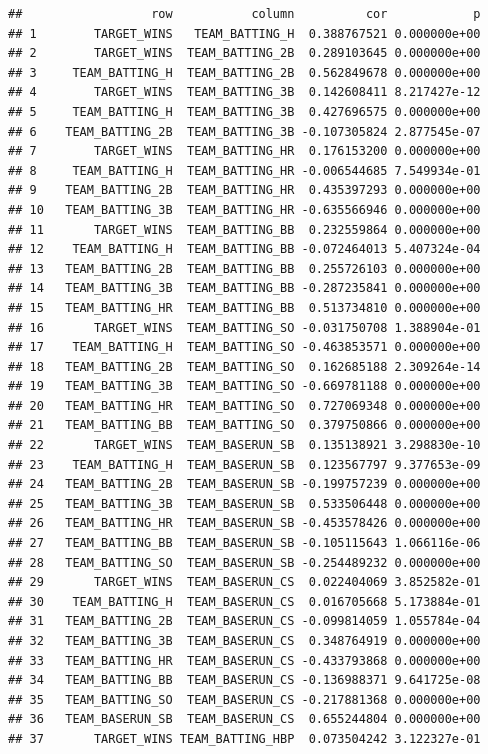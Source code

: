 \documentclass[
]{article}
\begin{document}
\begin{verbatim}
##                  row           column          cor            p
## 1        TARGET_WINS   TEAM_BATTING_H  0.388767521 0.000000e+00
## 2        TARGET_WINS  TEAM_BATTING_2B  0.289103645 0.000000e+00
## 3     TEAM_BATTING_H  TEAM_BATTING_2B  0.562849678 0.000000e+00
## 4        TARGET_WINS  TEAM_BATTING_3B  0.142608411 8.217427e-12
## 5     TEAM_BATTING_H  TEAM_BATTING_3B  0.427696575 0.000000e+00
## 6    TEAM_BATTING_2B  TEAM_BATTING_3B -0.107305824 2.877545e-07
## 7        TARGET_WINS  TEAM_BATTING_HR  0.176153200 0.000000e+00
## 8     TEAM_BATTING_H  TEAM_BATTING_HR -0.006544685 7.549934e-01
## 9    TEAM_BATTING_2B  TEAM_BATTING_HR  0.435397293 0.000000e+00
## 10   TEAM_BATTING_3B  TEAM_BATTING_HR -0.635566946 0.000000e+00
## 11       TARGET_WINS  TEAM_BATTING_BB  0.232559864 0.000000e+00
## 12    TEAM_BATTING_H  TEAM_BATTING_BB -0.072464013 5.407324e-04
## 13   TEAM_BATTING_2B  TEAM_BATTING_BB  0.255726103 0.000000e+00
## 14   TEAM_BATTING_3B  TEAM_BATTING_BB -0.287235841 0.000000e+00
## 15   TEAM_BATTING_HR  TEAM_BATTING_BB  0.513734810 0.000000e+00
## 16       TARGET_WINS  TEAM_BATTING_SO -0.031750708 1.388904e-01
## 17    TEAM_BATTING_H  TEAM_BATTING_SO -0.463853571 0.000000e+00
## 18   TEAM_BATTING_2B  TEAM_BATTING_SO  0.162685188 2.309264e-14
## 19   TEAM_BATTING_3B  TEAM_BATTING_SO -0.669781188 0.000000e+00
## 20   TEAM_BATTING_HR  TEAM_BATTING_SO  0.727069348 0.000000e+00
## 21   TEAM_BATTING_BB  TEAM_BATTING_SO  0.379750866 0.000000e+00
## 22       TARGET_WINS  TEAM_BASERUN_SB  0.135138921 3.298830e-10
## 23    TEAM_BATTING_H  TEAM_BASERUN_SB  0.123567797 9.377653e-09
## 24   TEAM_BATTING_2B  TEAM_BASERUN_SB -0.199757239 0.000000e+00
## 25   TEAM_BATTING_3B  TEAM_BASERUN_SB  0.533506448 0.000000e+00
## 26   TEAM_BATTING_HR  TEAM_BASERUN_SB -0.453578426 0.000000e+00
## 27   TEAM_BATTING_BB  TEAM_BASERUN_SB -0.105115643 1.066116e-06
## 28   TEAM_BATTING_SO  TEAM_BASERUN_SB -0.254489232 0.000000e+00
## 29       TARGET_WINS  TEAM_BASERUN_CS  0.022404069 3.852582e-01
## 30    TEAM_BATTING_H  TEAM_BASERUN_CS  0.016705668 5.173884e-01
## 31   TEAM_BATTING_2B  TEAM_BASERUN_CS -0.099814059 1.055784e-04
## 32   TEAM_BATTING_3B  TEAM_BASERUN_CS  0.348764919 0.000000e+00
## 33   TEAM_BATTING_HR  TEAM_BASERUN_CS -0.433793868 0.000000e+00
## 34   TEAM_BATTING_BB  TEAM_BASERUN_CS -0.136988371 9.641725e-08
## 35   TEAM_BATTING_SO  TEAM_BASERUN_CS -0.217881368 0.000000e+00
## 36   TEAM_BASERUN_SB  TEAM_BASERUN_CS  0.655244804 0.000000e+00
## 37       TARGET_WINS TEAM_BATTING_HBP  0.073504242 3.122327e-01

\end{verbatim}
\end{document}
